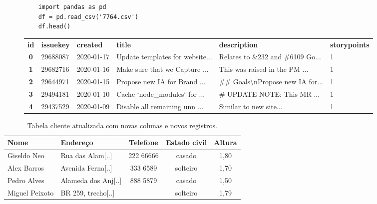 \begin{figure}
	\begin{lstlisting}
	import pandas as pd
	df = pd.read_csv('7764.csv')
	df.head()
	\end{lstlisting}

	\begin{tabular}{clllll}
	\multicolumn{1}{l}{\textbf{id}} &
	\multicolumn{1}{l}{\textbf{issuekey}} &
	\multicolumn{1}{l}{\textbf{created}} &
	\multicolumn{1}{l}{\textbf{title}} &
	\multicolumn{1}{l}{\textbf{description}} &
	\multicolumn{1}{l}{\textbf{storypoints}} \\
	\textbf{0} &
	  29688087 &
	  2020-01-17 &
	  Update templates for website... &
	  Relates to \&232 and \#6109 Go... &
	  1 \\
	\textbf{1} &
	  29682716 &
	  2020-01-16 &
	  Make sure that we Capture  ... &
	  This was raised in the PM ... &
	  1 \\
	\textbf{2} &
	  29644971 &
	  2020-01-15 &
	  Propose new IA for Brand ... &
	  \#\# Goals\textbackslash{}nPropose new IA for... &
	  1 \\
	\textbf{3} &
	  29494181 &
	  2020-01-10 &
	  Cache `node\_modules` for ... &
	  \# UPDATE NOTE: This MR ... &
	  1 \\
	\textbf{4} &
	  29437529 &
	  2020-01-09 &
	  Disable all remaining unn ... &
	  Similar to new site... &
	  1
	\end{tabular}%
	\label{tblstorypoint}

\end{figure}

\begin{table}
	\centering
	\caption{Tabela cliente atualizada com novas colunas e novos registros.}
	\begin{tabular}{|l|l|c|c|c|}
	\hline
	\textbf{Nome} & \textbf{Endereço} & \textbf{Telefone} & \textbf{Estado civil} & \textbf{Altura} \\
	\hline
	Giseldo Neo & Rua das Alam[..] & 222 66666 & casado & 1,80\\
	\hline
	Alex Barros & Avenida Ferna[..]& 333 6589 & solteiro & 1,70 \\
	\hline
	Pedro Alves & Alameda dos Anj[..]& 888 5879 & casado & 1,50 \\
	\hline
	Miguel Peixoto & BR 259, trecho[..]&  & solteiro & 1,79 \\
	\hline
	\end{tabular}
	\label{tblcliente_v2}
\end{table}


